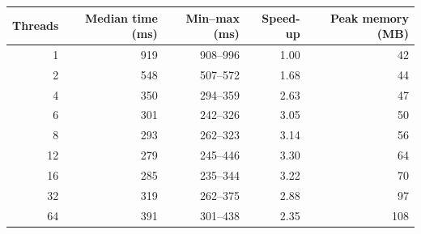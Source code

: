 \begin{tabular}{rrrrr}
\toprule
Threads & Median time (ms) & Min--max (ms) & Speed-up & Peak memory (MB) \\
\midrule
1 & 919 & 908--996 & 1.00 & 42 \\
2 & 548 & 507--572 & 1.68 & 44 \\
4 & 350 & 294--359 & 2.63 & 47 \\
6 & 301 & 242--326 & 3.05 & 50 \\
8 & 293 & 262--323 & 3.14 & 56 \\
12 & 279 & 245--446 & 3.30 & 64 \\
16 & 285 & 235--344 & 3.22 & 70 \\
32 & 319 & 262--375 & 2.88 & 97 \\
64 & 391 & 301--438 & 2.35 & 108 \\
\bottomrule
\end{tabular}
